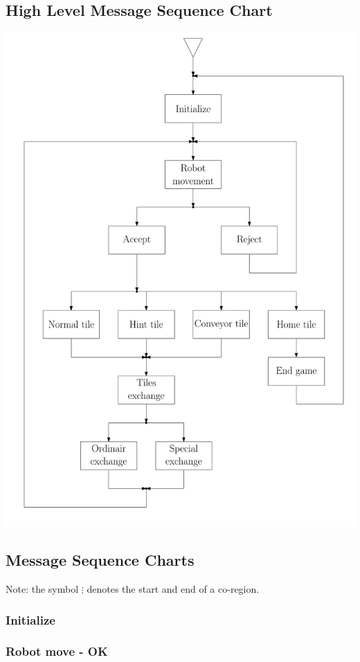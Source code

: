 \subsection{High Level Message Sequence Chart}
	\includegraphics[width=\linewidth,bb=0 0 680 1000]{MSC-files/HMSC.pdf}
	
\subsection{Message Sequence Charts}
	Note: the symbol $\vdots$ denotes the start and end of a co-region.

	\subsubsection{Initialize}
    	
    
	\subsubsection{Robot move - OK}
		
	
